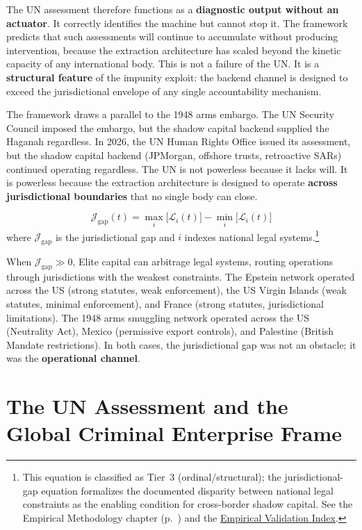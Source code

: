 The UN assessment therefore functions as a \textbf{diagnostic output without an actuator}. It correctly identifies the machine but cannot stop it. The framework predicts that such assessments will continue to accumulate without producing intervention, because the extraction architecture has scaled beyond the kinetic capacity of any international body. This is not a failure of the UN. It is a \textbf{structural feature} of the impunity exploit: the backend channel is designed to exceed the jurisdictional envelope of any single accountability mechanism.

The framework draws a parallel to the 1948 arms embargo. The UN Security Council imposed the embargo, but the shadow capital backend supplied the Haganah regardless. In 2026, the UN Human Rights Office issued its assessment, but the shadow capital backend (JPMorgan, offshore trusts, retroactive SARs) continued operating regardless. The UN is not powerless because it lacks will. It is powerless because the extraction architecture is designed to operate \textbf{across jurisdictional boundaries} that no single body can close.

\begin{equation}\label{eq:gp15c-jurisdictional-gap}
\mathcal{J}_{\text{gap}}(t) = \max_{i} \bigl[ \mathcal{L}_{i}(t) \bigr] - \min_{i} \bigl[ \mathcal{L}_{i}(t) \bigr]
\end{equation}
where $\mathcal{J}_{\text{gap}}$ is the jurisdictional gap and $i$ indexes national legal systems.\footnote{This equation is classified as Tier~3 (ordinal/structural); the jurisdictional-gap equation formalizes the documented disparity between national legal constraints as the enabling condition for cross-border shadow capital. See the Empirical Methodology chapter (p.~\pageref{ch:empirical_methodology}) and the \hyperref[app:empirical_index]{Empirical Validation Index}.}

When $\mathcal{J}_{\text{gap}} \gg 0$, Elite capital can arbitrage legal systems, routing operations through jurisdictions with the weakest constraints. The Epstein network operated across the US (strong statutes, weak enforcement), the US Virgin Islands (weak statutes, minimal enforcement), and France (strong statutes, jurisdictional limitations). The 1948 arms smuggling network operated across the US (Neutrality Act), Mexico (permissive export controls), and Palestine (British Mandate restrictions). In both cases, the jurisdictional gap was not an obstacle; it was the \textbf{operational channel}.

\section{The UN Assessment and the Global Criminal Enterprise Frame}

